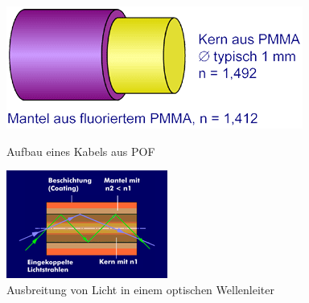 \begin{figure}[h]
    \begin{center}
        \begin{minipage}[t]{0.4\textwidth}
            \begin{center}
                \includegraphics[height=0.4\textwidth]{Bilder/Optische_Wellenleiter_Die_Polymer_Optische_Faser/Funktionsweise/pofprinzip.png}
                \caption[Aufbau eines Kabels aus POF \newline \url{http://www.pofac.fh-nuernberg.de/pofac/de/was_sind_pof/phys_prinzip.php}]{Aufbau eines Kabels aus POF} %
                \label{fig:pofprinzip}
            \end{center}
        \end{minipage}
        \hspace{0.025\textwidth}
        \begin{minipage}[t]{0.4\textwidth}
            \begin{center}
                \includegraphics[height=0.1\textheight]{Bilder/Optische_Wellenleiter_Die_Polymer_Optische_Faser/Funktionsweise/poflichtausbreitung.png}
                \caption[Ausbreitung von Licht in einem optischen Wellenleiter \newline \url{ITWissen}]{Ausbreitung von Licht in einem optischen Wellenleiter} %
                \label{fig:poflichtausbreitung}
            \end{center}
        \end{minipage}
    \end{center}
\end{figure}

